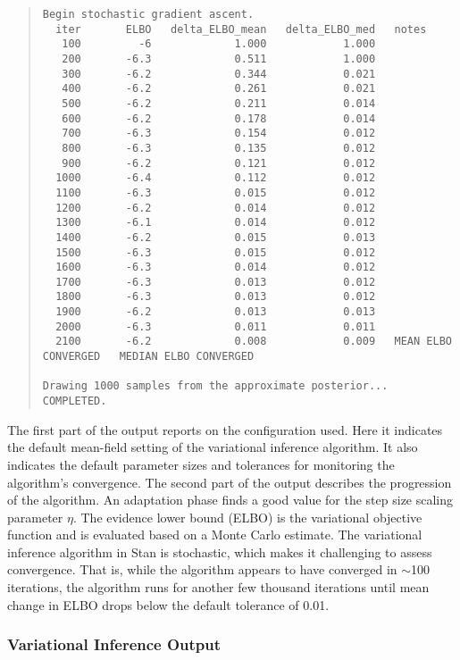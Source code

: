 \begin{quote}
\begin{Verbatim}[fontsize=\footnotesize]
Begin stochastic gradient ascent.
  iter       ELBO   delta_ELBO_mean   delta_ELBO_med   notes
   100         -6             1.000            1.000
   200       -6.3             0.511            1.000
   300       -6.2             0.344            0.021
   400       -6.2             0.261            0.021
   500       -6.2             0.211            0.014
   600       -6.2             0.178            0.014
   700       -6.3             0.154            0.012
   800       -6.3             0.135            0.012
   900       -6.2             0.121            0.012
  1000       -6.4             0.112            0.012
  1100       -6.3             0.015            0.012
  1200       -6.2             0.014            0.012
  1300       -6.1             0.014            0.012
  1400       -6.2             0.015            0.013
  1500       -6.3             0.015            0.012
  1600       -6.3             0.014            0.012
  1700       -6.3             0.013            0.012
  1800       -6.3             0.013            0.012
  1900       -6.2             0.013            0.013
  2000       -6.3             0.011            0.011
  2100       -6.2             0.008            0.009   MEAN ELBO CONVERGED   MEDIAN ELBO CONVERGED

Drawing 1000 samples from the approximate posterior... COMPLETED.
\end{Verbatim}
\end{quote}
%
The first part of the output reports on the configuration used. Here
it indicates the default mean-field setting of the variational
inference algorithm. It also indicates the default parameter sizes and
tolerances for monitoring the algorithm's convergence. The second part
of the output describes the progression of the algorithm. An adaptation
phase finds a good value for the step size scaling parameter $\eta$. The
evidence
lower bound (ELBO) is the variational objective function and is
evaluated based on a Monte Carlo estimate. The variational inference
algorithm in Stan is stochastic, which makes it challenging to assess
convergence. That is, while the algorithm appears to have converged in
$\sim$100 iterations, the algorithm runs for another few thousand
iterations until mean change in ELBO drops below the default
tolerance of 0.01.


\subsubsection{Variational Inference Output}

